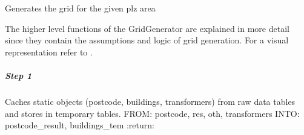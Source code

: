 \documentclass[letterpaper,10pt,english]{sphinxmanual}
\begin{document}

\begin{fulllineitems}
\label{\detokenize{grid_generation/explanation/grid_generation_process:syngrid.GridGenerator.GridGenerator}}
\pysigstartsignatures
{}
\pysigstopsignatures
\sphinxAtStartPar
Generates the grid for the given plz area

\end{fulllineitems}


\sphinxAtStartPar
The higher level functions of the GridGenerator are explained in more detail since they contain the assumptions and logic
of grid generation. For a visual representation refer to {\hyperref[\detokenize{grid_generation/explanation/overview::doc}]{}}.


\subparagraph{Step 1}
\label{\detokenize{grid_generation/explanation/grid_generation_process:step-1}}

\begin{fulllineitems}
\label{\detokenize{grid_generation/explanation/grid_generation_process:syngrid.GridGenerator.GridGenerator.cache_and_preprocess_static_objects}}
\pysigstartsignatures
{}
\pysigstopsignatures
\sphinxAtStartPar
Caches static objects (postcode, buildings, transformers) from raw data tables and
stores in temporary tables.
FROM: postcode, res, oth, transformers
INTO: postcode\_result, buildings\_tem
:return:

\end{fulllineitems}
\end{document}
